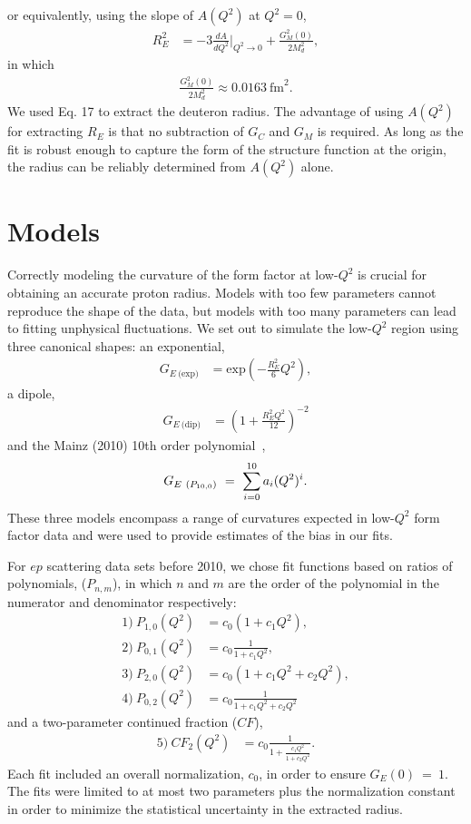 \documentclass[aps,prd,twocolumn,groupedaddress,10pt]{revtex4-1}
\begin{document}
or equivalently, using the slope of $A(Q^2)$ at $Q^2=0$,
\begin{align}
R_E^2 &= -3 \frac{dA}{dQ^2} \bigg|_{Q^2\rightarrow0} + \frac{G_M^2(0)}{2 M_d^2},
\end{align}
in which
\begin{align}
 \frac{G_M^2(0)}{2 M_d^2} \approx 0.0163~\text{fm}^2.
\end{align}
We used Eq. 17 to extract the deuteron radius. The advantage of using $A(Q^2)$ for extracting $R_E$ is that no subtraction of $G_C$ and $G_M$ is required. As long as the fit is robust enough to capture the form of the structure function at the origin, the radius can be reliably determined from $A(Q^2)$ alone.

\section{Models}\label{models}

Correctly modeling the curvature of the form factor at low-$Q^2$ is crucial for obtaining an accurate proton radius. Models with too few parameters cannot reproduce the shape of the data, but models with too many parameters can lead to fitting unphysical fluctuations. We set out to simulate the low-$Q^2$ region using three canonical shapes: an exponential,
\begin{align}
{G_{E~\text{(exp)}}} &= \text{exp}\left({-\frac{R_E^2}{6}Q^2}\right),
\end{align}
a dipole,
\begin{align}
{G_{E~\text{(dip)}}} &= \left(1+\frac{R_E^2 Q^2}{12}\right)^{-2}
\end{align} 
and the Mainz (2010) 10th order polynomial~\cite{Mainz2010}, 
\begin{align}
G_{E~\text({P}_{10,0})}~=~\sum_{i=0}^{10} a_i (Q^2)^i.
\end{align}
These three models encompass a range of curvatures expected in low-$Q^2$ form factor data and were used to provide estimates of the bias in our fits. 

For $ep$ scattering data sets before 2010, we chose fit functions based on ratios of polynomials, ($P_{n,m}$), in which $n$ and $m$ are the order of the polynomial in the numerator and denominator respectively:
\begin{align}
1)~P_{1,0}(Q^2) &= c_0(1+c_1 Q^2),\\
2)~P_{0,1}(Q^2) &= c_0 \frac{1}{1+c_1 Q^2},\\
3)~P_{2,0}(Q^2) &= c_0(1+c_1 Q^2 + c_2Q^2),\\
4)~P_{0,2}(Q^2) &= c_0 \frac{1}{1+c_1 Q^2+c_2 Q^2}
\end{align}
and a two-parameter continued fraction ($CF$),
\begin{align}
5)~CF_2(Q^2) &= c_0 \frac{1}{1+\frac{c_1 Q^2}{1+c_2 Q^2}}.
\end{align}
Each fit included an overall normalization, $c_0$, in order to ensure $G_E(0)~=~1$. The fits were limited to at most two parameters plus the normalization constant in order to minimize the statistical uncertainty in the extracted radius. 
\end{document}

